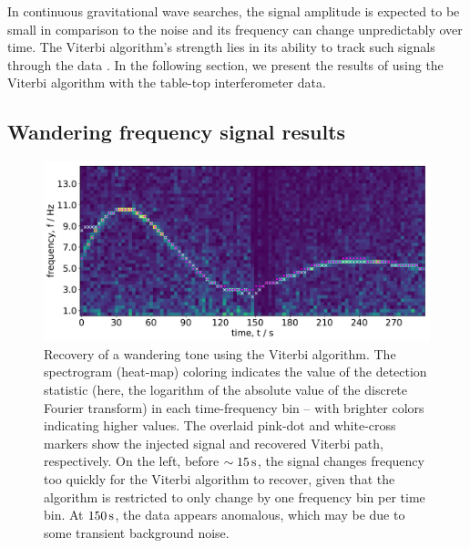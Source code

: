 \documentclass[paper-main.tex]{subfiles}
\begin{document}
In continuous gravitational wave searches, the signal amplitude is expected to be small in comparison to the noise and its frequency can change unpredictably over time.
The Viterbi algorithm's strength lies in its ability to track such signals through the data .
In the following section, we present the results of using the Viterbi algorithm with the table-top interferometer data. 







\subsection{Wandering frequency signal results}
\label{sec:wanderingResults}

\begin{figure}
	\includegraphics[width=\textwidth]{figures/expt_overlay_2_viterbi_test_webcam.pdf}
	\caption{\label{fig:viterbi_overlay}
Recovery of a wandering tone using the Viterbi algorithm.
The spectrogram (heat-map) coloring indicates the value of the detection statistic (here, the logarithm of the absolute value of the discrete Fourier transform) in each time-frequency bin -- with brighter colors indicating higher values. 
The overlaid pink-dot and white-cross markers show the injected signal and recovered Viterbi path, respectively. 
On the left, before $\sim 15\,{\rm s}$, the signal changes frequency too quickly for the Viterbi algorithm to recover, given that the algorithm is restricted to only change by one frequency bin per time bin. 
At $150\,{\rm s}$, the data appears anomalous, which may be due to some transient background noise. }
\end{figure}
 
\end{document}

